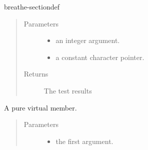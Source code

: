 \documentclass[letterpaper,10pt,english]{sphinxmanual}
\begin{document}
\begin{fulllineitems}
\begin{sphinxuseclass}{breathe-sectiondef}
\begin{fulllineitems}
\begin{quote}\begin{description}
\item[{Parameters}] \leavevmode\begin{itemize}
\item {} 
\sphinxAtStartPar
{} \textendash{} an integer argument. 

\item {} 
\sphinxAtStartPar
{} \textendash{} a constant character pointer. 

\end{itemize}

\item[{Returns}] \leavevmode
\sphinxAtStartPar
The test results 

\end{description}\end{quote}

\end{fulllineitems}


\begin{fulllineitems}
\label{\detokenize{api/classQTstyle__Test:_CPPv4N12QTstyle_Test9testMeTooEcc}}
\pysigstartsignatures
\pysigstartmultiline
{}
\pysigstopmultiline
\pysigstopsignatures
\sphinxAtStartPar
A pure virtual member. 

\sphinxAtStartPar


\nopagebreak


\sphinxAtStartPar
{\hyperref[\detokenize{api/classQTstyle__Test:classQTstyle__Test_1a8840748753118dd468e8368a28e49c62}]{}} 



\begin{quote}\begin{description}
\item[{Parameters}] \leavevmode\begin{itemize}
\item {} 
\sphinxAtStartPar
{} \textendash{} the first argument. 


\end{itemize}
\end{description}
\end{quote}
\end{fulllineitems}
\end{sphinxuseclass}
\end{fulllineitems}
\end{document}
